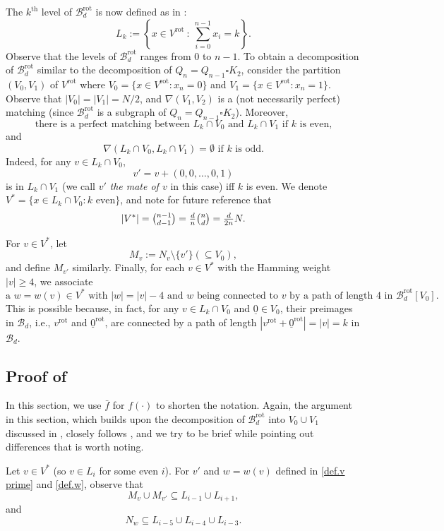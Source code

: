 \documentclass{amsart}
\theoremstyle{definition}
\newcommand{\cB}{\mathcal{B} }
\newcommand{\beq}[1]{\begin{equation}\label{#1}}
\newcommand{\enq}[0]{\end{equation}}
\newcommand{\nin}[0]{\noindent}
\newcommand{\sub}[0]{\subseteq}
\newcommand{\0}[0]{\emptyset}
\newcommand{\rot}[0]{\text{rot}}
\begin{document}
The $k^\text{th}$ level of $\cB_d^\rot$ is now defined as in \cite{EG}:	
	\[
		L_k := \left\{x\in V^\rot\ :\   \sum_{i=0}^{n-1}x_i = k\right\}.
	\]
Observe that the levels of $\cB_d^\rot$ ranges from 0 to $n-1$.
To obtain a decomposition of $\cB_d^\rot$ similar to the decomposition of $Q_n=Q_{n-1} \square K_2$, consider the partition $(V_0,V_1)$ of $V^\rot$ where $V_0=\{x \in V^\rot:x_n=0\}$ and $V_1=\{x \in V^\rot:x_n=1\}$. Observe that $|V_0|=|V_1|=N/2$, and $\nabla(V_1,V_2)$ is a (not necessarily perfect) matching (since $\cB_d^\rot$ is a subgraph of $Q_n=Q_{n-1} \square K_2$). Moreover,
\[\mbox{there is a perfect matching between $L_k \cap V_0$ and $L_k \cap V_1$ if $k$ is even,}\]
and
\[\mbox{$\nabla(L_k \cap V_0,L_k \cap V_1)=\emptyset$ if $k$ is odd}.\] 
Indeed, for any $v \in L_k \cap V_0$, 
\beq{def.v prime} v'=v + (0,0,\dots, 0,1)\enq
 is in $L_k \cap V_1$ (we call $v'$ \textit{the mate of $v$} in this case) iff $k$ is even. We denote $V^*=\{x \in L_k \cap V_0:k \text{ even}\}$, and note for future reference that 
		\begin{equation}\label{eq:VStarSize}
			|V^*| = \tbinom{n-1}{d-1} = \tfrac{d}{n}\tbinom{n}{d} = \tfrac{d}{2n}N.
		\end{equation}
	


\nin For $v \in V^*$, let \[M_v:=N_v \setminus \{v'\} (\sub V_0),\] and define $M_{v'}$ similarly. Finally, for each $v \in V^*$ with the Hamming weight $|v|\ge 4$, we associate 
\beq{def.w} \mbox{a $w = w(v) \in V^*$ with $|w|=|v|-4$ and $w$ being connected to $v$ by a path of length 4 in $\cB_d^\rot[V_0]$.}\enq
This is possible because, in fact, for any $v \in L_k \cap V_0$ and $\underline 0 \in V_0$, their preimages in $\cB_d$, i.e., $v^\rot$ and $\underline 0^\rot$, are connected by a path of length $|v^\rot +\underline 0^\rot|=|v|=k$ in $\cB_d$.


\subsection{Proof of }\label{subsec.pf of step1} In this section, we use $\bar f$ for $f(\cdot)$ to shorten the notation. Again, the argument in this section, which builds upon the decomposition of $\cB_d^\rot$ into $V_0 \cup V_1$ discussed in , closely follows \cite{Kahn,EG}, and we try to be brief while pointing out differences that is worth noting. 



Let $v\in V^*$ (so $v\in L_i$ for some even $i$). For $v'$ and $w=w(v)$ defined in \eqref{def.v prime} and \eqref{def.w}, observe that
	\begin{equation}\label{eq:sub1}
	M_v\cup M_{v'} \subseteq L_{i-1}\cup L_{i+1},
	\end{equation}
and	
	\begin{equation}\label{eq:sub2}
	N_w \subseteq L_{i-5}\cup L_{i-4}\cup L_{i-3}.
	\end{equation}
\end{document}
